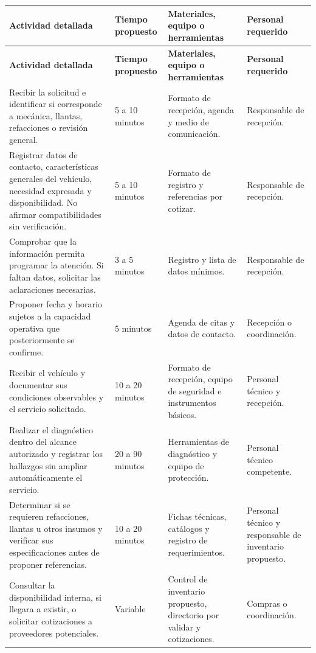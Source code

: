 {\begin{longtable}{|p{}|p{}|p{}|p{}|}
\hline
\textbf{Actividad detallada} & \textbf{Tiempo propuesto} & \textbf{Materiales, equipo o herramientas} & \textbf{Personal requerido} \\
\hline
\endfirsthead
\hline
\textbf{Actividad detallada} & \textbf{Tiempo propuesto} & \textbf{Materiales, equipo o herramientas} & \textbf{Personal requerido} \\
\hline
\endhead
Recibir la solicitud e identificar si corresponde a mecánica, llantas, refacciones o revisión general. & 5 a 10 minutos & Formato de recepción, agenda y medio de comunicación. & Responsable de recepción. \\
\hline
Registrar datos de contacto, características generales del vehículo, necesidad expresada y disponibilidad. No afirmar compatibilidades sin verificación. & 5 a 10 minutos & Formato de registro y referencias por cotizar. & Responsable de recepción. \\
\hline
Comprobar que la información permita programar la atención. Si faltan datos, solicitar las aclaraciones necesarias. & 3 a 5 minutos & Registro y lista de datos mínimos. & Responsable de recepción. \\
\hline
Proponer fecha y horario sujetos a la capacidad operativa que posteriormente se confirme. & 5 minutos & Agenda de citas y datos de contacto. & Recepción o coordinación. \\
\hline
Recibir el vehículo y documentar sus condiciones observables y el servicio solicitado. & 10 a 20 minutos & Formato de recepción, equipo de seguridad e instrumentos básicos. & Personal técnico y recepción. \\
\hline
Realizar el diagnóstico dentro del alcance autorizado y registrar los hallazgos sin ampliar automáticamente el servicio. & 20 a 90 minutos & Herramientas de diagnóstico y equipo de protección. & Personal técnico competente. \\
\hline
Determinar si se requieren refacciones, llantas u otros insumos y verificar sus especificaciones antes de proponer referencias. & 10 a 20 minutos & Fichas técnicas, catálogos y registro de requerimientos. & Personal técnico y responsable de inventario propuesto. \\
\hline
Consultar la disponibilidad interna, si llegara a existir, o solicitar cotizaciones a proveedores potenciales. & Variable & Control de inventario propuesto, directorio por validar y cotizaciones. & Compras o coordinación. \\

\end{longtable}}
